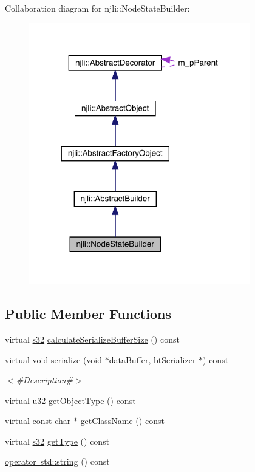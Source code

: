 Collaboration diagram for njli\+:\+:Node\+State\+Builder\+:\nopagebreak
\begin{figure}[H]
\begin{center}
\leavevmode
\includegraphics[width=273pt]{classnjli_1_1_node_state_builder__coll__graph}
\end{center}
\end{figure}
\subsection*{Public Member Functions}
\begin{DoxyCompactItemize}
\item 
virtual \mbox{\hyperlink{_util_8h_aa62c75d314a0d1f37f79c4b73b2292e2}{s32}} \mbox{\hyperlink{classnjli_1_1_node_state_builder_ab69b90abd6b2c1d4b75e0b84c66074b1}{calculate\+Serialize\+Buffer\+Size}} () const
\item 
virtual \mbox{\hyperlink{_thread_8h_af1e856da2e658414cb2456cb6f7ebc66}{void}} \mbox{\hyperlink{classnjli_1_1_node_state_builder_a92d4e7b8cf9b1c6e7371879ed636d7ec}{serialize}} (\mbox{\hyperlink{_thread_8h_af1e856da2e658414cb2456cb6f7ebc66}{void}} $\ast$data\+Buffer, bt\+Serializer $\ast$) const
\begin{DoxyCompactList}\small\item\em $<$\#\+Description\#$>$ \end{DoxyCompactList}\item 
virtual \mbox{\hyperlink{_util_8h_a10e94b422ef0c20dcdec20d31a1f5049}{u32}} \mbox{\hyperlink{classnjli_1_1_node_state_builder_a13715317d483013399224e1053df0442}{get\+Object\+Type}} () const
\item 
virtual const char $\ast$ \mbox{\hyperlink{classnjli_1_1_node_state_builder_a3121e4e027fa11034e4eab047eff63d6}{get\+Class\+Name}} () const
\item 
virtual \mbox{\hyperlink{_util_8h_aa62c75d314a0d1f37f79c4b73b2292e2}{s32}} \mbox{\hyperlink{classnjli_1_1_node_state_builder_a225d2ae7bd1e60f041d15ae5bd4492e1}{get\+Type}} () const
\item 
\mbox{\hyperlink{classnjli_1_1_node_state_builder_a9eefa7f0c864fc1064ba071a730f4e0b}{operator std\+::string}} () const
\end{DoxyCompactItemize}
